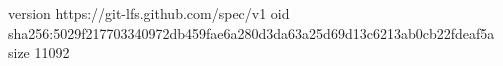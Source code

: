 version https://git-lfs.github.com/spec/v1
oid sha256:5029f217703340972db459fae6a280d3da63a25d69d13c6213ab0cb22fdeaf5a
size 11092
